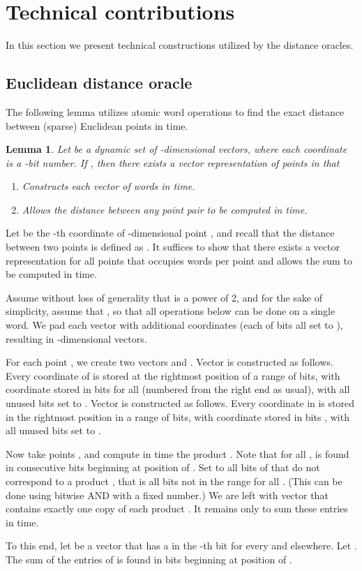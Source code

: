 \documentclass[11pt]{article}
\newtheorem{lemma}[theorem]{Lemma}
\newenvironment{proof}{{\bf Proof:\ }}{\hfill\medskip}
\begin{document}
\section{Technical contributions}\label{sec:technical}

In this section we present technical constructions utilized by the distance
oracles.


\subsection{Euclidean distance oracle}\label{sec:bit-trick}
The following lemma utilizes atomic word operations to find the exact distance
between (sparse) Euclidean points in  time.

\begin{lemma}\label{lem:bit-dist}
Let  be a dynamic set of -dimensional vectors, where each coordinate is a
-bit number. If , then there exists a
vector representation of points in  that
\begin{enumerate}
\item
Constructs each vector of  words in  time.
\item
Allows the  distance between any point pair  to be computed
in  time.
\end{enumerate}
\end{lemma}
\begin{proof}
Let  be the -th coordinate of -dimensional point , and
recall that the  distance between two points  is
defined as
.
It suffices to show
that there exists a vector representation for all points 
that occupies  words per point and
allows the sum  to be computed in  time.

Assume without loss of generality that  is a power of 2, and
for the sake of simplicity, assume that , so that all operations below can be done on a
single word. We pad each vector with  additional coordinates (each of  bits all set
to ), resulting in -dimensional vectors.

For each point , we create two vectors  and . Vector
 is constructed as follows. Every coordinate of  is
stored at the rightmost position of a range of  bits, with coordinate
 stored in bits  for all 
(numbered from the right end as usual), with all unused bits set to . Vector  is constructed as
follows. Every coordinate in  is stored in the
rightmost position in a range of  bits, with coordinate  stored
in bits , with all unused bits set to .

Now take points , and compute in  time the
product . Note that for all ,  is found in
 consecutive bits beginning at position  of . Set to 
all bits of  that do not correspond to a product , that is
all bits not in the range  for all . (This can be done using bitwise AND with a fixed number.) We are left
with vector  that contains exactly one copy of each product .
It remains only to sum these entries in  time.

To this end, let  be a vector that has a
 in the -th bit for every 
and  elsewhere. Let . The sum of the entries of  is
found in  bits beginning at position  of .
\end{proof}
\end{document}
